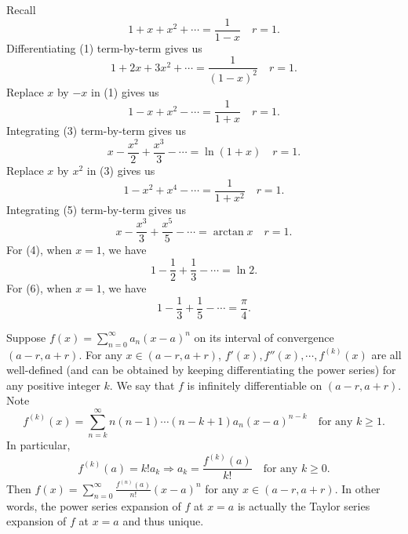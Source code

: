    \begin{exampleenv}
        Recall
        \begin{equation}
            1+x+x^2 + \cdots = \frac{1}{1-x} \quad r=1. \tag{1}
        \end{equation}
        Differentiating (1) term-by-term gives us
        \begin{equation}
            1 + 2x + 3x^2 + \cdots = \frac{1}{(1-x)^2} \quad r=1. \tag{2}
        \end{equation}
        Replace $x$ by $-x$ in (1) gives us
        \begin{equation}
            1-x+x^2 - \cdots = \frac{1}{1+x} \quad r=1. \tag{3}
        \end{equation}
        Integrating (3) term-by-term gives us
        \begin{equation}
            x - \frac{x^2}{2} + \frac{x^3}{3} - \cdots = \ln(1+x) \quad r=1. \tag{4}
        \end{equation}
        Replace $x$ by $x^2$ in (3) gives us
        \begin{equation}
            1-x^2+x^4 - \cdots = \frac{1}{1+x^2} \quad r=1. \tag{5}
        \end{equation}
        Integrating (5) term-by-term gives us
        \begin{equation}
            x - \frac{x^3}{3} + \frac{x^5}{5} - \cdots = \arctan x \quad r=1. \tag{6}
        \end{equation}
        For (4), when $x=1$, we have
        \[
            1 - \frac{1}{2} + \frac{1}{3} - \cdots = \ln 2.
        \]
        For (6), when $x=1$, we have
        \[
            1 - \frac{1}{3} + \frac{1}{5} - \cdots = \frac{\pi}{4}.
        \]
    \end{exampleenv}
    \begin{remarkenv}
        Suppose $f(x) = \displaystyle \sum_{n=0}^\infty a_n (x-a)^n$ on its interval of convergence $(a-r,a+r)$. For any $x\in (a-r,a+r)$, $f'(x), f''(x), \cdots, f^{(k)}(x)$ are all well-defined (and can be obtained by keeping differentiating the power series) for any positive integer $k$. We say that $f$ is infinitely differentiable on $(a-r,a+r)$. Note
        $$ f^{(k)}(x) = \sum_{n=k}^\infty n(n-1)\cdots (n-k+1) a_n (x-a)^{n-k} \quad \text{for any } k\ge 1. $$
        In particular,
        $$ f^{(k)}(a) = k! a_k \Rightarrow a_k = \frac{f^{(k)}(a)}{k!} \quad \text{for any } k\ge 0. $$
        Then $f(x) = \displaystyle \sum_{n=0}^\infty \frac{f^{(n)}(a)}{n!} (x-a)^n$ for any $x\in (a-r,a+r)$. In other words, the power series expansion of $f$ at $x=a$ is actually the Taylor series expansion of $f$ at $x=a$ and thus unique.
    \end{remarkenv}
